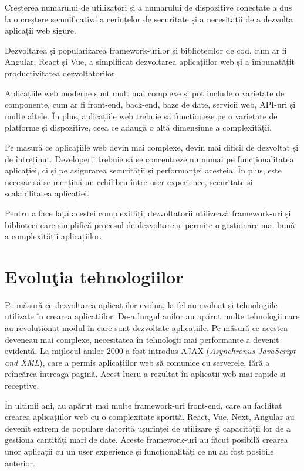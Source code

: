 \documentclass[12pt, a4paper]{report}
\begin{document}
Creșterea numarului de utilizatori și a numarului de dispozitive conectate a dus la o creștere semnificativă a cerințelor de securitate și a necesității de a dezvolta aplicații web sigure.

Dezvoltarea și popularizarea framework-urilor și bibliotecilor de cod, cum ar fi Angular, React și Vue, a simplificat dezvoltarea aplicațiilor web și a îmbunatățit productivitatea dezvoltatorilor.

Aplicațiile web moderne sunt mult mai complexe și pot include o varietate de componente, cum ar fi front-end, back-end, baze de date, servicii web, API-uri și multe altele. În plus, aplicațiile web trebuie să functioneze pe o varietate de platforme și dispozitive, ceea ce adaugă o altă dimensiune a complexității.

Pe masură ce aplicațiile web devin mai complexe, devin mai dificil de dezvoltat și de întreținut. Developerii trebuie să se concentreze nu numai pe funcționalitatea aplicației, ci și pe asigurarea securității și performanței acesteia. În plus, este necesar să se mențină un echilibru între user experience, securitate și scalabilitatea aplicației.

Pentru a face față acestei complexități, dezvoltatorii utilizează framework-uri și biblioteci care simplifică procesul de dezvoltare și permite o gestionare mai bună a complexității aplicațiilor.

\section{Evolu\c tia tehnologiilor}

Pe măsură ce dezvoltarea aplicațiilor evolua, la fel au evoluat și tehnologiile utilizate în crearea aplicațiilor. De-a lungul anilor au apărut multe tehnologii care au revoluționat modul în care sunt dezvoltate aplicațiile. Pe măsură ce acestea deveneau mai complexe, necesitatea în tehnologii mai performante a devenit evidentă. La mijlocul anilor 2000 a fost introdus AJAX (\emph{Asynchronus JavaScript and XML}), care a permis aplicațiilor web să comunice cu serverele, fără a reîncărca întreaga pagină. Acest lucru a rezultat în aplicații web mai rapide și receptive.

În ultimii ani, au apărut mai multe framework-uri front-end, care au facilitat crearea aplicațiilor web cu o complexitate sporită. React, Vue, Next, Angular au devenit extrem de populare datorită ușurinței de utilizare și capacității lor de a gestiona cantități mari de date. Aceste framework-uri au făcut posibilă crearea unor aplicații cu un user experience și funcționalități ce nu au fost posibile anterior.
\end{document}
